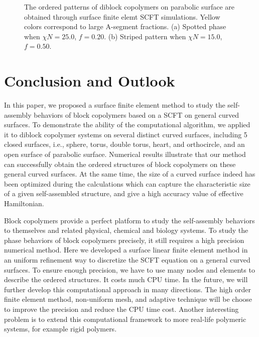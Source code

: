 \documentclass[final,1p,times]{elsarticle}
\begin{document}
\begin{figure}[H]
\setlength{\captionmargin}{2pt}
\centering
{}
    \hspace{0.5cm}
\caption{\label{fig:parabolic}
The ordered patterns of diblock copolymers on
parabolic surface are obtained through surface finite elemt SCFT
simulations. 
Yellow colors correspond to large A-segment fractions.
(a) Spotted phase when $\chi N = 25.0$, $f = 0.20$.
(b) Striped pattern when $\chi N = 15.0$, $f = 0.50$.
}
\end{figure}

\section{Conclusion and Outlook}
\label{sec:conclusion}

In this paper, we proposed a surface finite element method to study the
self-assembly behaviors of block copolymers based on a SCFT on general curved
surfaces. To demonstrate the ability of the computational
algorithm, we applied it to diblock copolymer systems on several distinct
curved surfaces, including 5 closed surfaces, i.e., sphere, torus, double
torus, heart, and orthocircle, and an open surface of parabolic surface.
Numerical results illustrate that our method can successfully obtain the
ordered structures of block copolymers on these general curved surfaces. At the
same time, the size of a curved surface indeed has been optimized during the
calculations which can capture the characteristic size of a given
self-assembled structure, and give a high accuracy value of effective
Hamiltonian.  

Block copolymers provide a perfect platform to study the self-assembly
behaviors to themselves and related physical, chemical and biology systems.  To
study the phase behaviors of block copolymers precisely, it still requires a
high precision numerical method.  Here we developed a surface linear finite
element method in an uniform refinement way to discretize the SCFT equation on
a general curved surfaces.  To ensure enough precision, we have to use many
nodes and elements to describe the ordered structures. It costs much
CPU time.  In the future, we will further develop this computational approach
in many directions. The high order finite element method, non-uniform mesh, and
adaptive technique will be choose to improve the precision and reduce the CPU
time cost. Another interesting problem is to extend this computational
framework to more real-life polymeric systems, for example rigid polymers. 
\end{document}
